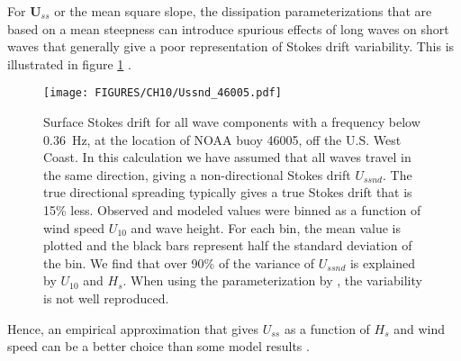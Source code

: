 For $ \mathbf{U}_{ss}$ or the mean square slope, the dissipation parameterizations that are based on a 
mean steepness can introduce spurious effects of long waves on short waves that 
generally give a poor representation of Stokes drift variability. This is illustrated in figure \ref{Ussnd} 
\citep[see also figure 8 in][]{Ardhuin&al.2010}. 
\begin{figure}[htb]
\centerline{\texttt{[image: FIGURES/CH10/Ussnd\_46005.pdf]}}
  \caption{Surface Stokes drift for all wave components with a frequency below 0.36~Hz, 
  at the location of NOAA buoy 46005, off the U.S. West Coast.
  In this calculation we have assumed that all waves travel in the same direction, giving 
  a non-directional Stokes drift $U_{ssnd}$. The true directional 
  spreading typically gives a true Stokes drift that is  15\% less. 
  Observed and modeled values were binned as a function of wind speed $U_{10}$ and wave height. For each bin, the 
  mean value is plotted and the black bars represent half the standard deviation of the bin. 
  We find that over 90\% of the variance of 
  $U_{ssnd}$ is explained by $U_{10}$ and $H_s$.
  When using the parameterization by \cite{Bidlot&al.2005}, the variability is not well reproduced. }
  \label{Ussnd}
\end{figure}
Hence, an empirical approximation that gives $U_{ss}$ as a function of $H_s$ and wind speed can be a better 
choice than some model results \citep[see eq. (C3) in][]{Ardhuin&al.2009}.

